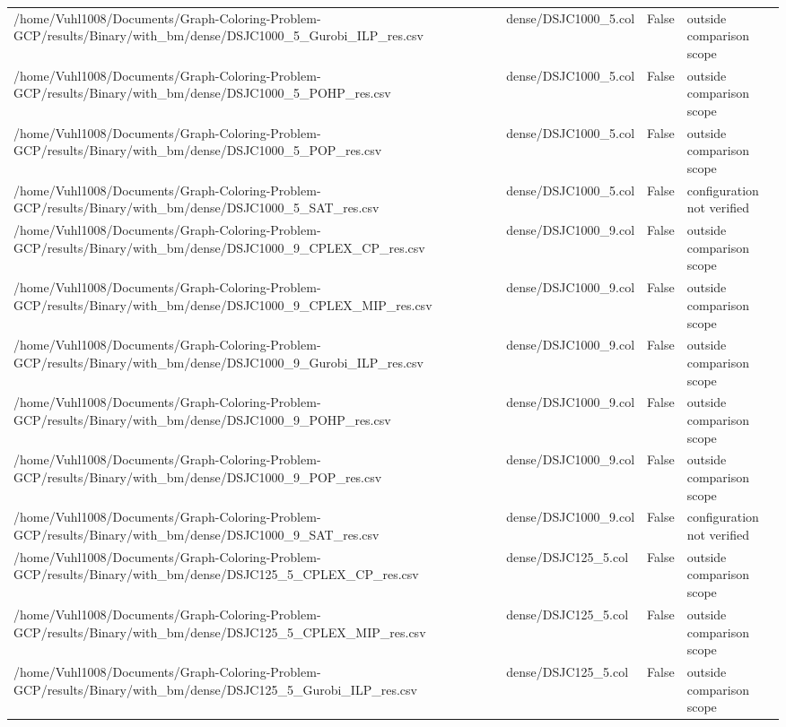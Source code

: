 \begin{table}[htbp]
\begin{tabular}{llll}
/home/Vuhl1008/Documents/Graph-Coloring-Problem-GCP/results/Binary/with\_bm/dense/DSJC1000\_5\_Gurobi\_ILP\_res.csv & dense/DSJC1000\_5.col & False & outside comparison scope \\
/home/Vuhl1008/Documents/Graph-Coloring-Problem-GCP/results/Binary/with\_bm/dense/DSJC1000\_5\_POHP\_res.csv & dense/DSJC1000\_5.col & False & outside comparison scope \\
/home/Vuhl1008/Documents/Graph-Coloring-Problem-GCP/results/Binary/with\_bm/dense/DSJC1000\_5\_POP\_res.csv & dense/DSJC1000\_5.col & False & outside comparison scope \\
/home/Vuhl1008/Documents/Graph-Coloring-Problem-GCP/results/Binary/with\_bm/dense/DSJC1000\_5\_SAT\_res.csv & dense/DSJC1000\_5.col & False & configuration not verified \\
/home/Vuhl1008/Documents/Graph-Coloring-Problem-GCP/results/Binary/with\_bm/dense/DSJC1000\_9\_CPLEX\_CP\_res.csv & dense/DSJC1000\_9.col & False & outside comparison scope \\
/home/Vuhl1008/Documents/Graph-Coloring-Problem-GCP/results/Binary/with\_bm/dense/DSJC1000\_9\_CPLEX\_MIP\_res.csv & dense/DSJC1000\_9.col & False & outside comparison scope \\
/home/Vuhl1008/Documents/Graph-Coloring-Problem-GCP/results/Binary/with\_bm/dense/DSJC1000\_9\_Gurobi\_ILP\_res.csv & dense/DSJC1000\_9.col & False & outside comparison scope \\
/home/Vuhl1008/Documents/Graph-Coloring-Problem-GCP/results/Binary/with\_bm/dense/DSJC1000\_9\_POHP\_res.csv & dense/DSJC1000\_9.col & False & outside comparison scope \\
/home/Vuhl1008/Documents/Graph-Coloring-Problem-GCP/results/Binary/with\_bm/dense/DSJC1000\_9\_POP\_res.csv & dense/DSJC1000\_9.col & False & outside comparison scope \\
/home/Vuhl1008/Documents/Graph-Coloring-Problem-GCP/results/Binary/with\_bm/dense/DSJC1000\_9\_SAT\_res.csv & dense/DSJC1000\_9.col & False & configuration not verified \\
/home/Vuhl1008/Documents/Graph-Coloring-Problem-GCP/results/Binary/with\_bm/dense/DSJC125\_5\_CPLEX\_CP\_res.csv & dense/DSJC125\_5.col & False & outside comparison scope \\
/home/Vuhl1008/Documents/Graph-Coloring-Problem-GCP/results/Binary/with\_bm/dense/DSJC125\_5\_CPLEX\_MIP\_res.csv & dense/DSJC125\_5.col & False & outside comparison scope \\
/home/Vuhl1008/Documents/Graph-Coloring-Problem-GCP/results/Binary/with\_bm/dense/DSJC125\_5\_Gurobi\_ILP\_res.csv & dense/DSJC125\_5.col & False & outside comparison scope \\

\end{tabular}
\end{table}
